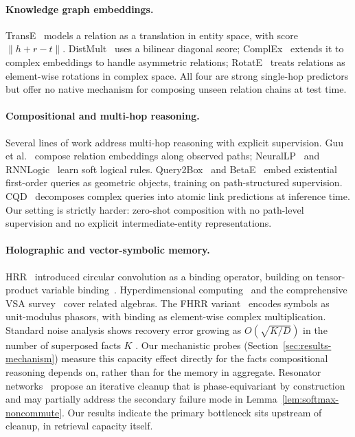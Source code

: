 \documentclass[11pt]{article}
\theoremstyle{definition}
\begin{document}
\paragraph{Knowledge graph embeddings.}
TransE~\cite{bordes2013transe} models a relation as a translation in entity
space, with score $\|h + r - t\|$. DistMult~\cite{yang2014distmult} uses a
bilinear diagonal score; ComplEx~\cite{trouillon2016complex} extends it to
complex embeddings to handle asymmetric relations; RotatE~\cite{sun2019rotate}
treats relations as element-wise rotations in complex space. All four are strong
single-hop predictors but offer no native mechanism for composing unseen
relation chains at test time.

\paragraph{Compositional and multi-hop reasoning.}
Several lines of work address multi-hop reasoning with explicit supervision.
Guu et al.~\cite{guu2015traversing} compose relation embeddings along observed
paths; NeuralLP~\cite{yang2017neurallp} and RNNLogic~\cite{qu2021rnnlogic}
learn soft logical rules. Query2Box~\cite{ren2020query2box} and
BetaE~\cite{ren2020beta} embed existential first-order queries as geometric
objects, training on path-structured supervision.
CQD~\cite{arakelyan2021complex} decomposes complex queries into atomic link
predictions at inference time. Our setting is strictly harder: zero-shot
composition with no path-level supervision and no explicit intermediate-entity
representations.

\paragraph{Holographic and vector-symbolic memory.}
HRR~\cite{plate2003holographic} introduced circular convolution as a binding
operator, building on tensor-product variable binding~\cite{smolensky1990tensor}.
Hyperdimensional computing~\cite{kanerva2009hyperdimensional} and the
comprehensive VSA survey~\cite{schlegel2022comparison} cover related algebras.
The FHRR variant~\cite{plate2003holographic,schlegel2022comparison} encodes
symbols as unit-modulus phasors, with binding as element-wise complex
multiplication. Standard noise analysis shows recovery error growing as
$O(\sqrt{K/D})$ in the number of superposed facts $K$
\cite{plate2003holographic}. Our mechanistic probes
(Section~\ref{sec:results-mechanism}) measure this capacity effect directly for
the facts compositional reasoning depends on, rather than for the memory in
aggregate. Resonator networks~\cite{frady2020resonator} propose an iterative
cleanup that is phase-equivariant by construction and may partially address the
secondary failure mode in Lemma~\ref{lem:softmax-noncommute}. Our results
indicate the primary bottleneck sits upstream of cleanup, in retrieval capacity
itself.
\end{document}
